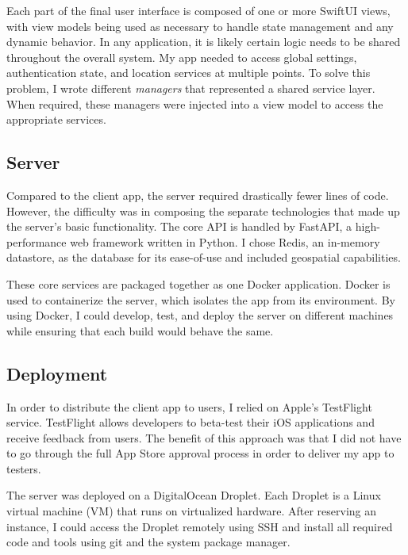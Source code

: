 Each part of the final user interface is composed of one or more \textsf{SwiftUI} views, with view models being used as necessary to handle state management and any dynamic behavior. In any application, it is likely certain logic needs to be shared throughout the overall system. My app needed to access global settings, authentication state, and location services at multiple points. To solve this problem, I wrote different \emph{managers} that represented a shared service layer. When required, these managers were injected into a view model to access the appropriate services.

\subsection{Server}

Compared to the client app, the server required drastically fewer lines of code. However, the difficulty was in composing the separate technologies that made up the server's basic functionality. The core \textsc{API} is handled by \textsf{FastAPI}, a high-performance web framework written in Python. I chose Redis, an in-memory datastore, as the database for its ease-of-use and included geospatial capabilities.

These core services are packaged together as one Docker application. Docker is used to containerize the server, which isolates the app from its environment. By using Docker, I could develop, test, and deploy the server on different machines while ensuring that each build would behave the same.

\subsection{Deployment}

In order to distribute the client app to users, I relied on Apple's TestFlight service. TestFlight allows developers to beta-test their iOS applications and receive feedback from users. The benefit of this approach was that I did not have to go through the full App Store approval process in order to deliver my app to testers.

The server was deployed on a DigitalOcean Droplet. Each Droplet is a Linux virtual machine (\textsc{VM}) that runs on virtualized hardware. After reserving an instance, I could access the Droplet remotely using \textsc{SSH} and install all required code and tools using \textsf{git} and the system package manager.
